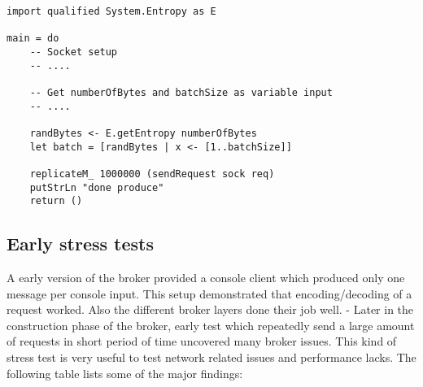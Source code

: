 \begin{lstlisting}
import qualified System.Entropy as E

main = do 
    -- Socket setup 
    -- ....

    -- Get numberOfBytes and batchSize as variable input 
    -- ....

    randBytes <- E.getEntropy numberOfBytes 
    let batch = [randBytes | x <- [1..batchSize]]

    replicateM_ 1000000 (sendRequest sock req) 
    putStrLn "done produce"
    return ()

\end{lstlisting}

\subsection{Early stress tests}
A early version of the broker provided a console client which produced only one
message per console input. This setup demonstrated that encoding/decoding of a
request worked. Also the different broker layers done their job well.    -
Later in the construction phase of the broker, early test which repeatedly send
a large amount of requests in short period of time uncovered many broker
issues. This kind of stress test is very useful to test network related issues
and performance lacks. The following table lists some of the major findings: 

